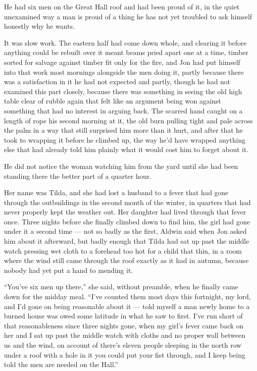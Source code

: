 He had six men on the Great Hall roof and had been proud of it, in the quiet unexamined way a man is proud of a thing he has not yet troubled to ask himself honestly why he wants.

It was slow work. The eastern half had come down whole, and clearing it before anything could be rebuilt over it meant beams pried apart one at a time, timber sorted for salvage against timber fit only for the fire, and Jon had put himself into that work most mornings alongside the men doing it, partly because there was a satisfaction in it he had not expected and partly, though he had not examined this part closely, because there was something in seeing the old high table clear of rubble again that felt like an argument being won against something that had no interest in arguing back. The scarred hand caught on a length of rope his second morning at it, the old burn pulling tight and pale across the palm in a way that still surprised him more than it hurt, and after that he took to wrapping it before he climbed up, the way he’d have wrapped anything else that had already told him plainly what it would cost him to forget about it.

He did not notice the woman watching him from the yard until she had been standing there the better part of a quarter hour.

\sceneBreak

Her name was Tilda, and she had lost a husband to a fever that had gone through the outbuildings in the second month of the winter, in quarters that had never properly kept the weather out. Her daughter had lived through that fever once. Three nights before she finally climbed down to find him, the girl had gone under it a second time — not so badly as the first, Aldwin said when Jon asked him about it afterward, but badly enough that Tilda had sat up past the middle watch pressing wet cloth to a forehead too hot for a child that thin, in a room where the wind still came through the roof exactly as it had in autumn, because nobody had yet put a hand to mending it.

“You’ve six men up there,” she said, without preamble, when he finally came down for the midday meal. “I’ve counted them most days this fortnight, my lord, and I’d gone on being reasonable about it — told myself a man newly home to a burned house was owed some latitude in what he saw to first. I’ve run short of that reasonableness since three nights gone, when my girl’s fever came back on her and I sat up past the middle watch with cloths and no proper wall between us and the wind, on account of there’s eleven people sleeping in the north row under a roof with a hole in it you could put your fist through, and I keep being told the men are needed on the Hall.”

